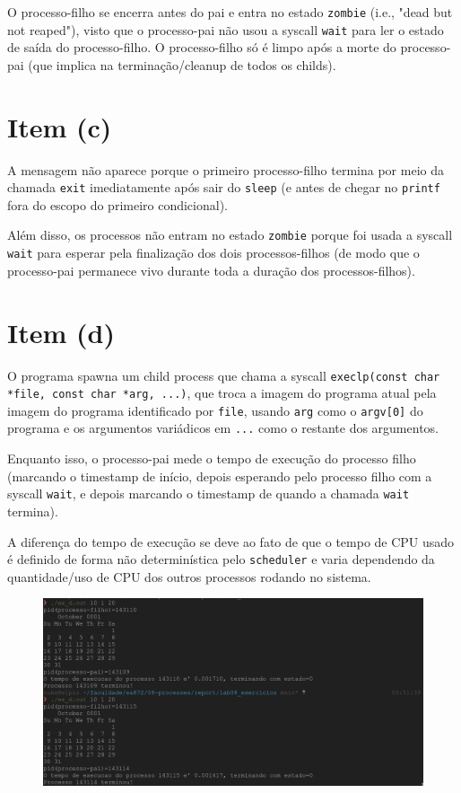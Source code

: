 \documentclass{article}
\begin{document}
O processo-filho se encerra antes do pai e entra no estado \texttt{zombie} (i.e., "dead but not reaped"), visto que o processo-pai não usou a syscall \texttt{wait} para ler o estado de saída do processo-filho. O processo-filho só é limpo após a morte do processo-pai (que implica na terminação/cleanup de todos os childs).

\section*{Item (c)}

A mensagem não aparece porque o primeiro processo-filho termina por meio da chamada \texttt{exit} imediatamente após sair do \texttt{sleep} (e antes de chegar no \texttt{printf} fora do escopo do primeiro condicional).

Além disso, os processos não entram no estado \texttt{zombie} porque foi usada a syscall \texttt{wait} para esperar pela finalização dos dois processos-filhos (de modo que o processo-pai permanece vivo durante toda a duração dos processos-filhos).

\newpage
\section*{Item (d)}

O programa spawna um child process que chama a syscall \texttt{execlp(const char *file, const char *arg, ...)}, que troca a imagem do programa atual pela imagem do programa identificado por \texttt{file}, usando \texttt{arg} como o \texttt{argv[0]} do programa e os argumentos variádicos em \texttt{...} como o restante dos argumentos. 

Enquanto isso, o processo-pai mede o tempo de execução do processo filho (marcando o timestamp de início, depois esperando pelo processo filho com a syscall \texttt{wait}, e depois marcando o timestamp de quando a chamada \texttt{wait} termina).

A diferença do tempo de execução se deve ao fato de que o tempo de CPU usado é definido de forma não determinística pelo \texttt{scheduler} e varia dependendo da quantidade/uso de CPU dos outros processos rodando no sistema.

\begin{figure}[!ht]
    \begin{center}
        \includegraphics[width=\textwidth]{images/item_d.png}
    \end{center}
\end{figure} 
\FloatBarrier
\end{document}

